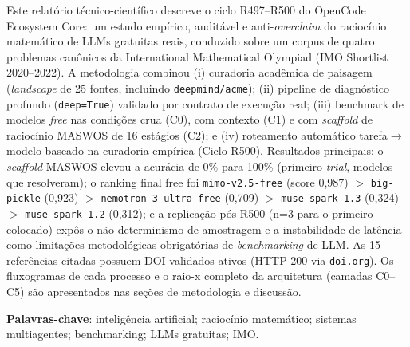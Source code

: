 \begin{resumo}
Este relatório técnico-científico descreve o ciclo R497--R500 do OpenCode
Ecosystem Core: um estudo empírico, auditável e anti-\textit{overclaim} do
raciocínio matemático de LLMs gratuitas reais, conduzido sobre um corpus de
quatro problemas canônicos da International Mathematical Olympiad (IMO
Shortlist 2020--2022). A metodologia combinou (i) curadoria acadêmica de
paisagem (\textit{landscape} de 25 fontes, incluindo \texttt{deepmind/acme});
(ii) pipeline de diagnóstico profundo (\texttt{deep=True}) validado por
contrato de execução real; (iii) benchmark de modelos \textit{free} nas
condições crua (C0), com contexto (C1) e com \textit{scaffold} de raciocínio
MASWOS de 16 estágios (C2); e (iv) roteamento automático tarefa$\rightarrow$modelo
baseado na curadoria empírica (Ciclo R500). Resultados principais: o
\textit{scaffold} MASWOS elevou a acurácia de 0\% para 100\% (primeiro
\textit{trial}, modelos que resolveram); o ranking final free foi
\texttt{mimo-v2.5-free} (score 0,987) $>$ \texttt{big-pickle} (0,923) $>$
\texttt{nemotron-3-ultra-free} (0,709) $>$ \texttt{muse-spark-1.3} (0,324) $>$
\texttt{muse-spark-1.2} (0,312); e a replicação pós-R500 (n=3 para o primeiro
colocado) expôs o não-determinismo de amostragem e a instabilidade de
latência como limitações metodológicas obrigatórias de \textit{benchmarking}
de LLM. As 15 referências citadas possuem DOI validados ativos (HTTP 200 via
\texttt{doi.org}). Os fluxogramas de cada processo e o raio-x completo da
arquitetura (camadas C0--C5) são apresentados nas seções de metodologia e
discussão.
\end{resumo}

\textbf{Palavras-chave}: inteligência artificial; raciocínio matemático;
sistemas multiagentes; benchmarking; LLMs gratuitas; IMO.

